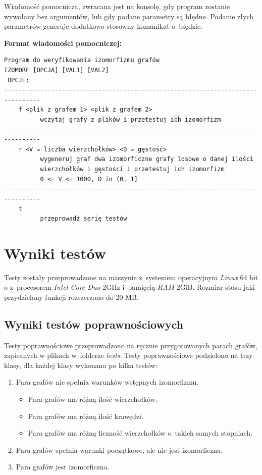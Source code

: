 \documentclass[12pt, a4paper, ]{article} %
\begin{document}
Wiadomość pomocnicza, zwracana jest na konsolę, gdy program zostanie wywołany bez
argumentów, lub gdy podane parametry są błędne. Podanie złych parametrów generuje
dodatkowo stosowny komunikat o~błędzie.

\vspace{1 em}

\noindent
\textbf{Format wiadomości pomocniczej:}
\begin{verbatim}
Program do weryfikowania izomorfizmu grafów
IZOMORF [OPCJA] [VAL1] [VAL2]
 OPCJE:
--------------------------------------------------------------------------------
    f <plik z grafem 1> <plik z grafem 2>
          wczytaj grafy z plików i przetestuj ich izomorfizm
--------------------------------------------------------------------------------
    r <V = liczba wierzchołków> <D = gęstość>
          wygeneruj graf dwa izomorficzne grafy losowe o danej ilości
          wierzchołków i gęstości i przetestuj ich izomorfizm
          0 <= V <= 1000, D in (0, 1]
--------------------------------------------------------------------------------
    t
          przeprowadź serię testów
\end{verbatim}

\clearpage
\section{Wyniki testów}
Testy zostały przeprowadzone na maszynie z~systemem operacyjnym \textit{Linux} 64 bit o
z~procesorem \textit{Intel Core Duo} 2GHz i~pamięcią \textit{RAM} 2GiB. Rozmiar
stosu jaki przydzielany funkcji rozszerzono do 20 MB.
\subsection{Wyniki testów poprawnościowych}
Testy poprawnościowe przeprowadzono na ręcznie przygotowanych parach grafów, zapisanych w
plikach w~folderze \emph{tests}. Testy poprawnościowe podzielono na trzy klasy, dla
każdej klasy wykonano po kilka testów:
\begin{enumerate}
  \item Para grafów nie spełnia warunków wstępnych izomorfizmu.
  \begin{itemize}
      \item Para grafów ma różną ilość wierzchołków.
      \item Para grafów ma różną ilość krawędzi.
      \item Para grafów ma różną liczność wierzchołków o~takich samych stopniach.
  \end{itemize}
  \item Para grafów spełnia warunki początkowe, ale nie jest izomorficzna.
  \item Para grafów jest izomorficzna.
\end{enumerate}
\end{document}
